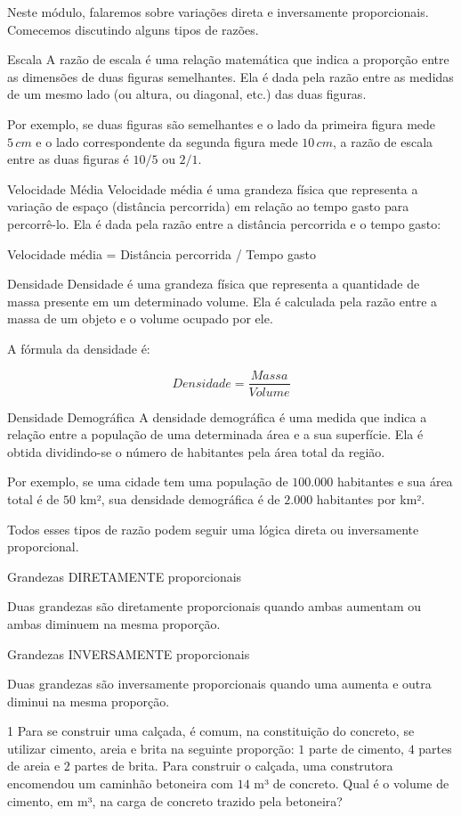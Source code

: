 Neste módulo, falaremos sobre variações direta e inversamente
proporcionais. Comecemos discutindo alguns tipos de razões.

Escala A razão de escala é uma relação matemática que indica a proporção
entre as dimensões de duas figuras semelhantes. Ela é dada pela razão
entre as medidas de um mesmo lado (ou altura, ou diagonal, etc.) das
duas figuras.

Por exemplo, se duas figuras são semelhantes e o lado da primeira figura
mede $5\,cm$ e o lado correspondente da segunda figura mede $10\,cm$, a razão
de escala entre as duas figuras é $10/5$ ou $2/1$.

Velocidade Média Velocidade média é uma grandeza física que representa a
variação de espaço (distância percorrida) em relação ao tempo gasto para
percorrê-lo. Ela é dada pela razão entre a distância percorrida e o
tempo gasto:

Velocidade média = Distância percorrida / Tempo gasto

Densidade Densidade é uma grandeza física que representa a quantidade de
massa presente em um determinado volume. Ela é calculada pela razão
entre a massa de um objeto e o volume ocupado por ele.

A fórmula da densidade é:

$$Densidade = \frac{Massa}{Volume} $$

Densidade Demográfica A densidade demográfica é uma medida que indica a
relação entre a população de uma determinada área e a sua superfície.
Ela é obtida dividindo-se o número de habitantes pela área total da
região.

Por exemplo, se uma cidade tem uma população de $100.000$ habitantes e sua
área total é de $50$ km², sua densidade demográfica é de $2.000$ habitantes
por km².

Todos esses tipos de razão podem seguir uma lógica direta ou
inversamente proporcional.

Grandezas DIRETAMENTE proporcionais

Duas grandezas são diretamente proporcionais quando ambas aumentam ou
ambas diminuem na mesma proporção.

Grandezas INVERSAMENTE proporcionais

Duas grandezas são inversamente proporcionais quando uma aumenta e outra
diminui na mesma proporção.


\num{1}  Para se construir uma calçada, é comum, na constituição do concreto,
se utilizar cimento, areia e brita na seguinte proporção: $1$ parte de
cimento, $4$ partes de areia e $2$ partes de brita. Para construir o
calçada, uma construtora encomendou um caminhão betoneira com $14$ m³ de
concreto. Qual é o volume de cimento, em m³, na carga de concreto
trazido pela betoneira?

